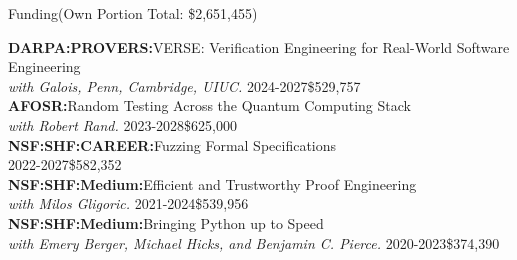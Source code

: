 \documentclass{resume} %
\begin{document}
\begin{rSectionFill}{Funding}{(Own Portion Total: \$2,651,455)}

  {\bf DARPA:PROVERS:}{VERSE: Verification Engineering for Real-World Software Engineering}\\
  {\em with Galois, Penn, Cambridge, UIUC.} 2024-2027\hfill{\$529,757}\\
  
  {\bf AFOSR:}{Random Testing Across the Quantum Computing Stack}\\
  {\em with Robert Rand.} 2023-2028\hfill{\$625,000}\\
  
  {\bf NSF:SHF:CAREER:}{Fuzzing Formal Specifications}\\
  2022-2027\hfill{\$582,352}\\
  
  {\bf NSF:SHF:Medium:}{Efficient and Trustworthy Proof Engineering}\\
  {\em with Milos Gligoric.} 2021-2024\hfill{\$539,956}\\
  
  {\bf NSF:SHF:Medium:}Bringing Python up to Speed\\
  {\em with Emery Berger, Michael Hicks, and Benjamin C. Pierce.} 2020-2023\hfill{\$374,390}\\
  
\end{rSectionFill}


\newcommand{\Catalin}{C\u{a}t\u{a}lin\xspace}
\newcommand{\Hritcu}{Hri\c{t}cu\xspace}
\newcommand{\Denes}{D\'en\`es\xspace}

\newcommand{\pub}[4]{
  {\bf #1} \hfill {\href{https://lemonidas.github.io/pdf/#2}{\bf \em #4}}\\
  {#3}
  }

\newcommand{\pubtwo}[6]{
  {\bf #1} \hfill {\href{https://lemonidas.github.io/pdf/#2}{\bf \em #4}}, {\href{https://lemonidas.github.io/pdf/#5}{\bf \em #6}}\\
  {#3}
  }

\newcommand{\pubsub}[5]{
  {\bf #1:} \hfill {\href{https://lemonidas.github.io/pdf/#2}{\bf \em #4}}\\
  {\bf #5}\\
  {#3}
  }
\end{document}
